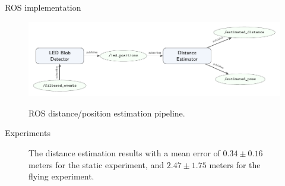 \documentclass{beamer}
\begin{document}
\begin{frame}{ROS implementation}

    \begin{figure}
        \centering
        \includegraphics[width=1.0\textwidth]{../fig/tikz/rosflow.pdf}
        \label{fig:ros}
        \caption{ROS distance/position estimation pipeline.}
    \end{figure}

\end{frame}

\begin{frame}{Experiments}

\begin{figure}[H]
	\centering
	\caption{
            The distance estimation results with a mean error of
            $0.34 \pm 0.16$ meters for the static experiment, and
            $2.47 \pm 1.75$ meters for the flying experiment.
        }
	\label{fig:experiment_results}
\end{figure}

\end{frame}
\end{document}

